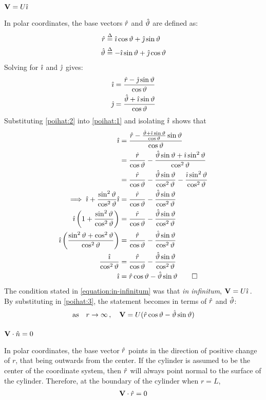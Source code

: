 \subsubsection{$\mathbf{V}=U\hat{\imath}$}\label{sec:vuihat}
In polar coordinates, the base vectors $\hat{r}$ and $\hat{\vartheta}$ are defined as:
\begin{align*}
	\hat{r}&\stackrel{\Delta}{=}\hat{\imath}\cos\vartheta+\hat{\jmath}\sin\vartheta\\
	\hat{\vartheta}&\stackrel{\Delta}{=}-\hat{\imath}\sin\vartheta+\hat{\jmath}\cos\vartheta
\end{align*}
Solving for $\hat{\imath}$ and $\hat{\jmath}$ gives:
\begin{align}
	\label{poihat:1}\hat{\imath}&=\frac{\hat{r}-\hat{\jmath}\sin\vartheta}{\cos\vartheta}\\
	\label{poihat:2}\hat{\jmath}&=\frac{\hat{\vartheta}+\hat{\imath}\sin\vartheta}{\cos\vartheta}
\end{align}
Substituting \ref{poihat:2} into \ref{poihat:1} and isolating $\hat{\imath}$ shows that
\begin{align}
	\notag\hat{\imath}&=\frac{\hat{r}-\frac{\hat{\vartheta}+\hat{\imath}\sin\vartheta}{\cos\vartheta}\sin\vartheta}{\cos\vartheta}\\
	\notag&=\frac{\hat{r}}{\cos\vartheta}-\frac{\hat{\vartheta}\sin\vartheta+\hat{\imath}\sin^2\vartheta}{\cos^2\vartheta}\\
	\notag&=\frac{\hat{r}}{\cos\vartheta}-\frac{\hat{\vartheta}\sin\vartheta}{\cos^2\vartheta}-\frac{\hat{\imath}\sin^2\vartheta}{\cos^2\vartheta}\\
	\notag\implies\hat{\imath}+\frac{\sin^2\vartheta}{\cos^2\vartheta}\hat{\imath}&=\frac{\hat{r}}{\cos\vartheta}-\frac{\hat{\vartheta}\sin\vartheta}{\cos^2\vartheta}\\
	\notag\hat{\imath}\left(1+\frac{\sin^2\vartheta}{\cos^2\vartheta}\right)&=\frac{\hat{r}}{\cos\vartheta}-\frac{\hat{\vartheta} \sin\vartheta}{\cos^2\vartheta}\\
	\notag\hat{\imath}\left(\frac{\sin^2\vartheta+\cos^2\vartheta}{\cos^2\vartheta}\right)&=\frac{\hat{r}}{\cos\vartheta}-\frac{\hat{\vartheta} \sin\vartheta}{\cos^2\vartheta}\\
	\notag\frac{\hat{\imath}}{\cos^2\vartheta}&=\frac{\hat{r}}{\cos\vartheta}-\frac{\hat{\vartheta} \sin\vartheta}{\cos^2\vartheta}\\
	\label{poihat:3}\hat{\imath}&=\hat{r}\cos\vartheta-\hat{\vartheta}\sin\vartheta\qed
\end{align}
The condition stated in \ref{equation:in-infinitum} was that \textit{in infinitum}, $\mathbf{V}=U\hat{\imath}$\,. By substituting in \ref{poihat:3}, the statement becomes in terms of $\hat{r}$ and $\hat{\vartheta}$:
$$
	\text{as}\quad r\rightarrow\infty\,,\quad\mathbf{V}=U(\hat{r}\cos\vartheta-\hat{\vartheta}\sin\vartheta)
$$

\subsubsection{$\mathbf{V}\cdot\hat{n}=0$}\label{sec:vdotnhatzero}
In polar coordinates, the base vector $\hat{r}$ points in the direction of positive change of $r$, that being outwards from the center. If the cylinder is assumed to be the center of the coordinate system, then $\hat{r}$ will always point normal to the surface of the cylinder. Therefore, at the boundary of the cylinder when $r=L$,
$$\begin{matrix}
	\mathbf{V}\cdot\hat{r}=0
\end{matrix}$$

